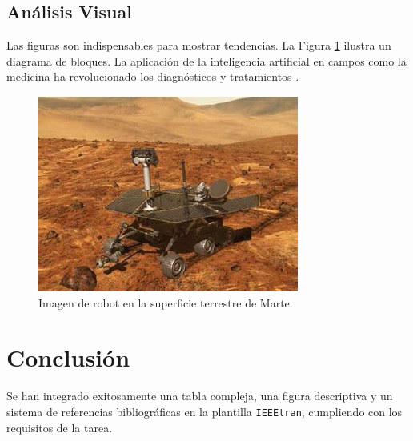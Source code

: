\documentclass[conference]{IEEEtran}
\begin{document}
\subsection{Análisis Visual}
Las figuras son indispensables para mostrar tendencias. La Figura \ref{fig:diagrama_bloques} ilustra un diagrama de bloques. La aplicación de la inteligencia artificial en campos como la medicina ha revolucionado los diagnósticos y tratamientos \cite{hamet2017artificial}.

\begin{figure}[h!]
\centering
\includegraphics[width=0.9\columnwidth]{ejemplo.jpg}
\caption{Imagen de robot en la superficie terrestre de Marte.}
\label{fig:diagrama_bloques}
\end{figure}


\section{Conclusión}
Se han integrado exitosamente una tabla compleja, una figura descriptiva y un sistema de referencias bibliográficas en la plantilla \texttt{IEEEtran}, cumpliendo con los requisitos de la tarea.

 


\end{document}
